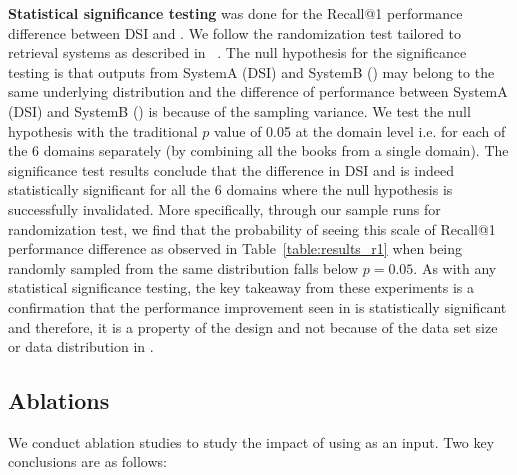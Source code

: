 \textbf{Statistical significance testing} was done for the Recall@1 performance difference between DSI and {\sys}.  We follow the randomization test tailored to retrieval systems as described in ~\citet{sig_test}. The null hypothesis for the significance testing is that outputs from SystemA (DSI) and SystemB ({\sys}) may belong to the same underlying distribution and the difference of performance between SystemA (DSI) and SystemB ({\sys}) is because of the sampling variance. We test the null hypothesis with the traditional $p$ value of 0.05 at the domain level i.e. for each of the $6$ domains separately (by combining all the books from a single domain). The significance test results conclude that the difference in DSI and {\sys} is indeed statistically significant for all the $6$ domains where the null hypothesis is successfully invalidated. More specifically, through our sample runs for randomization test, we find that the probability of seeing this scale of Recall@1 performance difference as observed in Table~\ref{table:results_r1} when being randomly sampled from the same distribution falls below $p=0.05$. As with any statistical significance testing, the key takeaway from these experiments is a confirmation that the performance improvement seen in {\sys} is statistically significant and therefore, it is a property of the {\sys} design and not because of the data set size or data distribution in {\ben}.

\subsection{Ablations}
\label{subsec:ablation}
We conduct ablation studies to study the impact of using {\toc} as an input. Two key conclusions are as follows:

